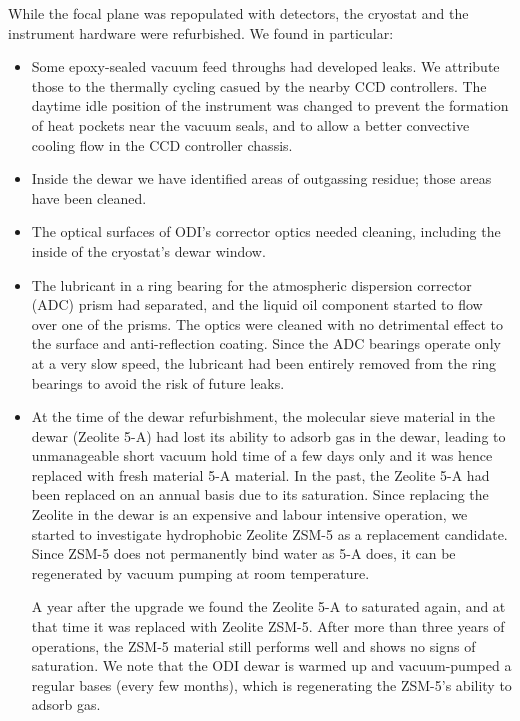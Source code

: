 \documentclass[]{spieman}
\begin{document}
While the focal plane was repopulated with detectors, the cryostat and the 
instrument hardware were refurbished. We found in particular:
\begin{itemize}
	\item Some epoxy-sealed vacuum feed throughs had developed  leaks. We 
	attribute those to the thermally cycling casued by the nearby CCD controllers. 
	The daytime idle position of the instrument was changed to prevent the 
	formation of heat pockets near the vacuum seals, and to allow a better
	convective cooling flow in the CCD controller chassis.
	
	\item Inside the dewar we have identified areas of outgassing residue; 
	those areas have been cleaned. 
	
	\item The optical surfaces of ODI's corrector optics needed cleaning,
	 including the inside of the cryostat's dewar window. 
	
	\item The lubricant in a ring bearing for the atmospheric dispersion 
	corrector (ADC) prism had separated, and the liquid oil component started to 
	flow over one of the prisms. The optics were cleaned with no detrimental effect 
	to the surface and anti-reflection coating. Since the ADC bearings operate 
	only at a very slow speed, the lubricant had been entirely removed from the 
	ring bearings to avoid the risk of future leaks. 
	

\item  At the time of the dewar refurbishment, the molecular 
sieve material in the dewar (Zeolite 5-A) had lost its ability to adsorb gas in 
the dewar, leading to unmanageable short vacuum hold time of a few days only 
and it was hence  replaced with fresh material 5-A material. In the past, the 
Zeolite 5-A had been replaced on an annual basis due to its saturation. Since 
replacing the Zeolite in the dewar is an expensive and labour intensive operation, 
we started to investigate hydrophobic Zeolite ZSM-5 as a replacement candidate. Since 
ZSM-5 does not permanently bind water as 5-A does, it can be regenerated by vacuum 
pumping at room temperature. 

A year after the upgrade we found the Zeolite 5-A to saturated again, and at that
time it was replaced with Zeolite ZSM-5. After more than three years of operations, 
the ZSM-5 material still performs well and shows no signs of saturation. We note 
that the ODI dewar is warmed up and vacuum-pumped a regular bases (every few months), 
which is regenerating the ZSM-5's ability to adsorb gas.
\end{itemize}
\end{document}
